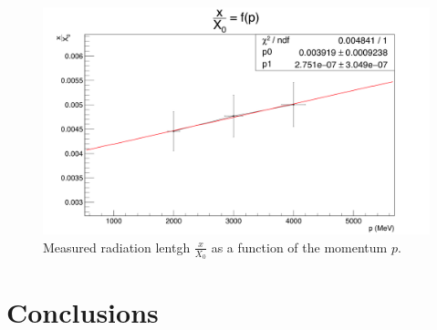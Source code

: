    \begin{figure}
     \centering
     \includegraphics[width =\textwidth]{Pictures/X0/radiationLength_2-4GeV.png}
     \caption{Measured radiation lentgh $\frac{x}{X_0}$ as a function of the momentum $p$.}
     \label{fig:X0vsP}
   \end{figure}

  \section{Conclusions}



